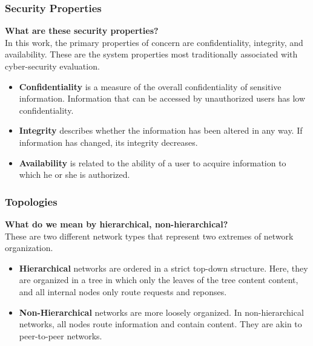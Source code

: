 \documentclass[t,handout]{beamer}
\begin{document}
\begin{frame}
\frametitle{Security Properties}
{\bf What are these security properties?} \\
{\small In this work, the primary properties of concern are confidentiality, integrity, and availability.  These are the system properties most traditionally associated with cyber-security evaluation.} \\
\begin{small}
\begin{itemize}
\item {\bf Confidentiality} is a measure of the overall confidentiality of sensitive information.  Information that can be accessed by unauthorized users has low confidentiality.
\item {\bf Integrity} describes whether the information has been altered in any way.  If information has changed, its integrity decreases.
\item {\bf Availability} is related to the ability of a user to acquire information to which he or she is authorized.
\end{itemize}
\end{small}
\end{frame}

\begin{frame}
\frametitle{Topologies}
{\bf What do we mean by hierarchical, non-hierarchical?} \\
{\small These are two different network types that represent two extremes of network organization.} \\
\begin{small}
\begin{itemize}
\item {\bf Hierarchical} networks are ordered in a strict top-down structure.  Here, they are organized in a tree in which only the leaves of the tree content content, and all internal nodes only route requests and reponses. 
\item {\bf Non-Hierarchical} networks are more loosely organized.  In non-hierarchical networks, all nodes route information and contain content.  They are akin to peer-to-peer networks.
\end{itemize}
\end{small}
\end{frame}
\end{document}

